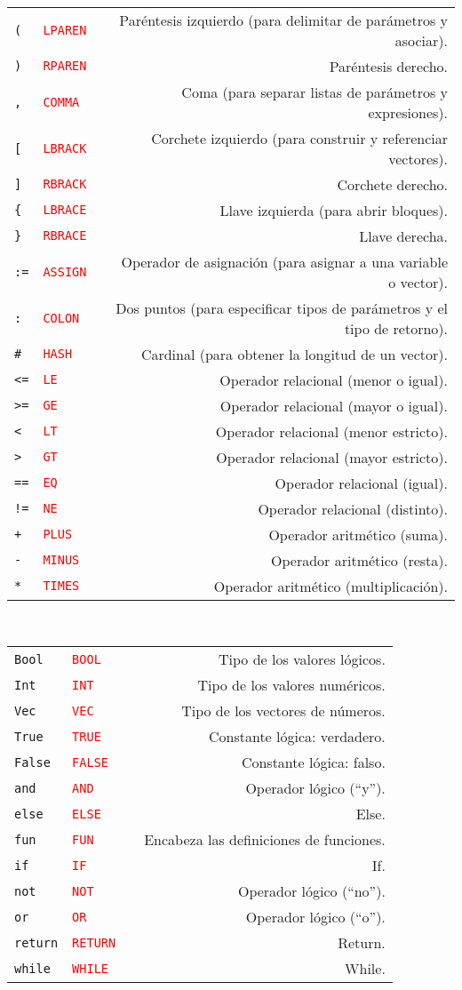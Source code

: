 \documentclass{article}
\newcommand{\tok}[1]{\textcolor{red}{\texttt{#1}}}
\newcommand{\symbolentry}[3]{#1 & #2 && #3 \\}
\newcommand{\nb}[1]{\footnotesize{#1}}
\begin{document}
\medskip\\
\begin{tabularx}{\textwidth}{llXr}
\symbolentry{\texttt{(}}{\tok{LPAREN}}{\nb{Par\'entesis izquierdo (para delimitar de par\'ametros y asociar).}}
\symbolentry{\texttt{)}}{\tok{RPAREN}}{\nb{Par\'entesis derecho.}}
\symbolentry{\texttt{,}}{\tok{COMMA}}{\nb{Coma (para separar listas de par\'ametros y expresiones).}}
\symbolentry{\texttt{[}}{\tok{LBRACK}}{\nb{Corchete izquierdo (para construir y referenciar vectores).}}
\symbolentry{\texttt{]}}{\tok{RBRACK} }{\nb{Corchete derecho.}}
\symbolentry{\texttt{\{}}{\tok{LBRACE}}{\nb{Llave izquierda (para abrir bloques).}}
\symbolentry{\texttt{\}}}{\tok{RBRACE}}{\nb{Llave derecha.}}
\symbolentry{\texttt{:=}}{\tok{ASSIGN}}{\nb{Operador de asignaci\'on (para asignar a una variable o vector).}}
\symbolentry{\texttt{:}}{\tok{COLON}}{\nb{Dos puntos (para especificar tipos de par\'ametros y el tipo de retorno).}}
\symbolentry{\texttt{\#}}{\tok{HASH}}{\nb{Cardinal (para obtener la longitud de un vector).}}
\symbolentry{\texttt{<=}}{\tok{LE}}{\nb{Operador relacional (menor o igual).}}
\symbolentry{\texttt{>=}}{\tok{GE}}{\nb{Operador relacional (mayor o igual).}}
\symbolentry{\texttt{<}}{\tok{LT}}{\nb{Operador relacional (menor estricto).}}
\symbolentry{\texttt{>}}{\tok{GT}}{\nb{Operador relacional (mayor estricto).}}
\symbolentry{\texttt{==}}{\tok{EQ}}{\nb{Operador relacional (igual).}}
\symbolentry{\texttt{!=}}{\tok{NE}}{\nb{Operador relacional (distinto).}}
\symbolentry{\texttt{+}}{\tok{PLUS}}{\nb{Operador aritm\'etico (suma).}}
\symbolentry{\texttt{-}}{\tok{MINUS}}{\nb{Operador aritm\'etico (resta).}}
\symbolentry{\texttt{*}}{\tok{TIMES}}{\nb{Operador aritm\'etico (multiplicaci\'on).}}
\end{tabularx}\bigskip

\medskip\\
\begin{tabularx}{\textwidth}{llXr}
\symbolentry{\texttt{Bool}}{\tok{BOOL}}{\nb{Tipo de los valores l\'ogicos.}}
\symbolentry{\texttt{Int}}{\tok{INT}}{\nb{Tipo de los valores num\'ericos.}}
\symbolentry{\texttt{Vec}}{\tok{VEC}}{\nb{Tipo de los vectores de n\'umeros.}}
\symbolentry{\texttt{True}}{\tok{TRUE}}{\nb{Constante l\'ogica: verdadero.}}
\symbolentry{\texttt{False}}{\tok{FALSE}}{\nb{Constante l\'ogica: falso.}}
\symbolentry{\texttt{and}}{\tok{AND}}{\nb{Operador l\'ogico (``y'').}}
\symbolentry{\texttt{else}}{\tok{ELSE}}{\nb{Else.}}
\symbolentry{\texttt{fun}}{\tok{FUN}}{\nb{Encabeza las definiciones de funciones.}}
\symbolentry{\texttt{if}}{\tok{IF}}{\nb{If.}}
\symbolentry{\texttt{not}}{\tok{NOT}}{\nb{Operador l\'ogico (``no'').}}
\symbolentry{\texttt{or}}{\tok{OR}}{\nb{Operador l\'ogico (``o'').}}
\symbolentry{\texttt{return}}{\tok{RETURN}}{\nb{Return.}}
\symbolentry{\texttt{while}}{\tok{WHILE}}{\nb{While.}}
\end{tabularx}
\end{document}
